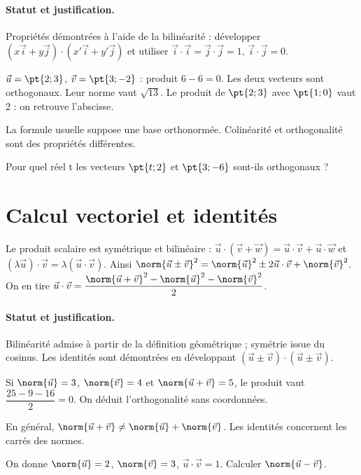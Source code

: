 \paragraph{Statut et justification.} Propriétés démontrées à l’aide de la bilinéarité : développer $(x\vec i+y\vec j)\cdot(x\prime\vec i+y\prime\vec j)$ et utiliser $\vec i\cdot\vec i=\vec j\cdot\vec j=1$, $\vec i\cdot\vec j=0$.
\begin{example}$\vec u=\pt{2;3}$, $\vec v=\pt{3;-2}$ : produit $6-6=0$. Les deux vecteurs sont orthogonaux. Leur norme vaut $\sqrt{13}$. Le produit de $\pt{2;3}$ avec $\pt{1;0}$ vaut 2 : on retrouve l’abscisse.\end{example}\label{C03-EX2}
\begin{pitfall}La formule usuelle suppose une base orthonormée. Colinéarité et orthogonalité sont des propriétés différentes.\end{pitfall}
\begin{application}Pour quel réel t les vecteurs $\pt{t;2}$ et $\pt{3;-6}$ sont-ils orthogonaux ?\end{application}\label{C03-AP2}
\section{Calcul vectoriel et identités}\label{C03-U3}
\begin{keypoint}
Le produit scalaire est symétrique et bilinéaire : $\vec u\cdot(\vec v+\vec w)=\vec u\cdot\vec v+\vec u\cdot\vec w$ et $(\lambda\vec u)\cdot\vec v=\lambda(\vec u\cdot\vec v)$. Ainsi $\norm{\vec u\pm\vec v}^2=\norm{\vec u}^2\pm2\vec u\cdot\vec v+\norm{\vec v}^2$. On en tire $\vec u\cdot \vec v=\dfrac{\norm{\vec u+\vec v}^2-\norm{\vec u}^2-\norm{\vec v}^2}{2}$.
\end{keypoint}
\paragraph{Statut et justification.} Bilinéarité admise à partir de la définition géométrique ; symétrie issue du cosinus. Les identités sont démontrées en développant $(\vec u\pm\vec v)\cdot(\vec u\pm\vec v)$.
\begin{example}Si $\norm{\vec u}=3$, $\norm{\vec v}=4$ et $\norm{\vec u+\vec v}=5$, le produit vaut $\dfrac{25-9-16}{2}=0$. On déduit l’orthogonalité sans coordonnées.\end{example}\label{C03-EX3}
\begin{pitfall}En général, $\norm{\vec u+\vec v}\ne\norm{\vec u}+\norm{\vec v}$. Les identités concernent les carrés des normes.\end{pitfall}
\begin{application}On donne $\norm{\vec u}=2$, $\norm{\vec v}=3$, $\vec u\cdot\vec v=1$. Calculer $\norm{\vec u-\vec v}$.\end{application}\label{C03-AP3}
